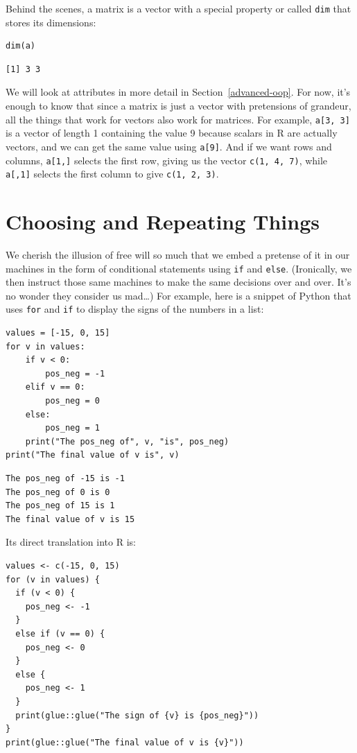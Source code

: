 Behind the scenes,
a matrix is a vector with a special property or  called \texttt{dim}
that stores its dimensions:

\begin{lstlisting}
dim(a)
\end{lstlisting}

\begin{lstlisting}
[1] 3 3
\end{lstlisting}

\noindent
We will look at attributes in more detail in Section~\ref{advanced-oop}.
For now,
it's enough to know that since a matrix is just a vector with pretensions of grandeur,
all the things that work for vectors also work for matrices.
For example,
\texttt{a[3, 3]} is a vector of length 1 containing the value 9
because scalars in R are actually vectors,
and we can get the same value using \texttt{a[9]}.
And if we want rows and columns,
\texttt{a[1,]} selects the first row,
giving us the vector \texttt{c(1, 4, 7)},
while \texttt{a[,1]} selects the first column
to give \texttt{c(1, 2, 3)}.

\section{Choosing and Repeating Things}

We cherish the illusion of free will so much that we embed a pretense of it in our machines
in the form of conditional statements using \texttt{if} and \texttt{else}.
(Ironically,
we then instruct those same machines to make the same decisions over and over.
It's no wonder they consider us mad{\ldots})
For example,
here is a snippet of Python that uses \texttt{for} and \texttt{if} to display
the signs of the numbers in a list:

\begin{lstlisting}
values = [-15, 0, 15]
for v in values:
    if v < 0:
        pos_neg = -1
    elif v == 0:
        pos_neg = 0
    else:
        pos_neg = 1
    print("The pos_neg of", v, "is", pos_neg)
print("The final value of v is", v)
\end{lstlisting}

\begin{lstlisting}
The pos_neg of -15 is -1
The pos_neg of 0 is 0
The pos_neg of 15 is 1
The final value of v is 15
\end{lstlisting}

Its direct translation into R is:

\begin{lstlisting}
values <- c(-15, 0, 15)
for (v in values) {
  if (v < 0) {
    pos_neg <- -1
  }
  else if (v == 0) {
    pos_neg <- 0
  }
  else {
    pos_neg <- 1
  }
  print(glue::glue("The sign of {v} is {pos_neg}"))
}
print(glue::glue("The final value of v is {v}"))
\end{lstlisting}

